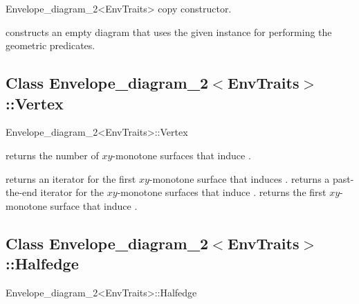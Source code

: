 \begin{ccRefClass}{Envelope_diagram_2<EnvTraits>}
    {copy constructor.}
        
    {constructs an empty diagram that uses the given 
     instance for performing the geometric predicates.}


\subsection*{Class Envelope\_diagram\_2$<$EnvTraits$>$::Vertex}

\begin{ccClass}{Envelope_diagram_2<EnvTraits>::Vertex}

\ccInheritsFrom

\ccAccessFunctions

{returns the number of $xy$-monotone surfaces that induce \ccVar.}

{returns an iterator for the first $xy$-monotone surface that induces \ccVar.}
\ccGlue
{}
{returns a past-the-end iterator for the $xy$-monotone surfaces that induce
 \ccVar.}
{returns the first $xy$-monotone surface that induce \ccVar.
 }

\end{ccClass}


\subsection*{Class Envelope\_diagram\_2$<$EnvTraits$>$::Halfedge}

\begin{ccClass}{Envelope_diagram_2<EnvTraits>::Halfedge}

\ccInheritsFrom

\ccAccessFunctions


\end{ccClass}
\end{ccRefClass}
